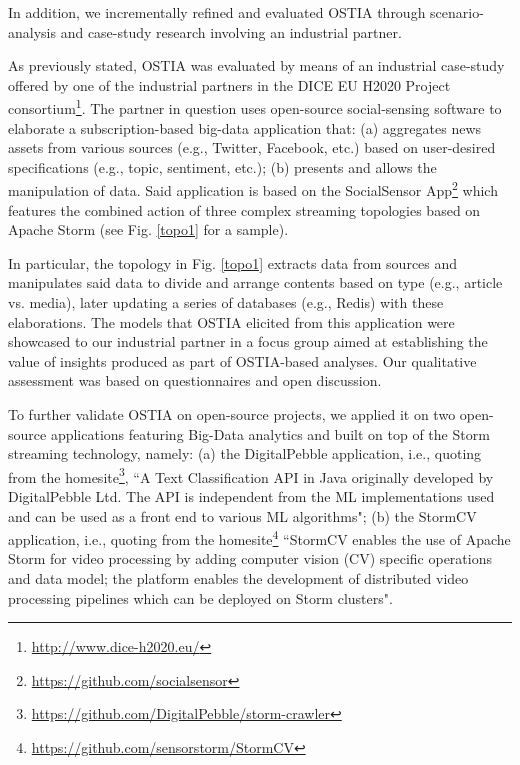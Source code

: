 In addition, we incrementally refined and evaluated OSTIA through scenario-analysis and case-study research \cite{casestudy} involving an industrial partner.

As previously stated, OSTIA was evaluated by means of an industrial case-study  offered by one of the industrial partners in the DICE EU H2020 Project consortium\footnote{\url{http://www.dice-h2020.eu/}}. 
The partner in question uses open-source social-sensing software to elaborate a subscription-based big-data application that: (a) aggregates news assets from various sources (e.g., Twitter, Facebook, etc.) based on user-desired specifications (e.g., topic, sentiment, etc.); (b) presents and allows the manipulation of data. Said  application is based on the SocialSensor App\footnote{\url{https://github.com/socialsensor}} which features the combined action of three complex streaming topologies based on Apache Storm (see Fig. \ref{topo1} for a sample).

In particular, the topology in Fig. \ref{topo1} extracts data from sources and manipulates said data to divide and arrange contents based on type (e.g., article vs. media), later updating a series of databases (e.g., Redis) with these elaborations. The models that OSTIA elicited from this application were showcased to our industrial partner in a focus group aimed at establishing the value of insights produced as part of OSTIA-based analyses. Our qualitative assessment was based on questionnaires and open discussion.

To further validate OSTIA on open-source projects, we applied it on two open-source applications featuring Big-Data analytics and built on top of the Storm streaming technology, namely: (a) the DigitalPebble application, i.e., quoting from the homesite\footnote{\url{https://github.com/DigitalPebble/storm-crawler}}, ``A Text Classification API in Java originally developed by DigitalPebble Ltd. The API is independent from the ML implementations used and can be used as a front end to various ML algorithms"; (b) the StormCV application, i.e., quoting from the homesite\footnote{\url{https://github.com/sensorstorm/StormCV}} ``StormCV enables the use of Apache Storm for video processing by adding computer vision (CV) specific operations and data model; the platform enables the development of distributed video processing pipelines which can be deployed on Storm clusters".


